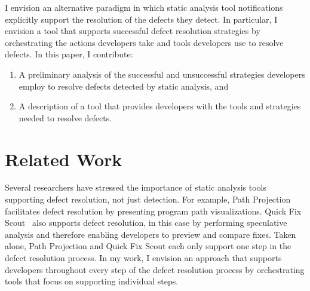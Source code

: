 \documentclass{sig-alternate}
\newcommand{\compresslist}{
	\vspace{-.5em}
	\setlength{\itemsep}{1pt}
	\setlength{\parskip}{0pt}
	\setlength{\parsep}{0pt}
}
\begin{document}
I envision an alternative paradigm in which static analysis tool notifications explicitly support the resolution of the defects they detect. 
In particular, I envision a tool that supports successful defect resolution strategies by orchestrating the actions developers take and tools developers use to resolve defects.
In this paper, I contribute: 
\begin{enumerate}
	\compresslist
	\item A preliminary analysis of the successful and unsuccessful strategies developers employ to resolve defects detected by static analysis, and
	\item A description of a tool that provides developers with the tools and strategies needed to resolve defects.
	
\end{enumerate}


\section{Related Work}
\label{sec:rw}
Several researchers have stressed the importance of static analysis tools supporting defect resolution, not just detection.
For example, Path Projection~\cite{Khoo2008} facilitates defect resolution by presenting program path visualizations. 
Quick Fix Scout~\cite{Muslu2012} also supports defect resolution, in this case by performing speculative analysis and therefore enabling developers to preview and compare fixes.
Taken alone, Path Projection and Quick Fix Scout each only support one step in the defect resolution process.
In my work, I envision an approach that supports developers throughout every step of the defect resolution process by orchestrating tools that focus on supporting individual steps.
\end{document}
